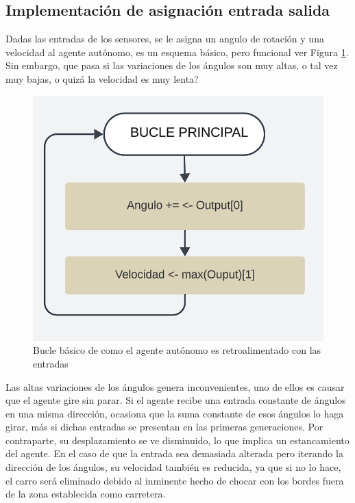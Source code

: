 \documentclass[conference]{IEEEtran}
\begin{document}
\subsection{Implementación de asignación entrada  salida}
Dadas las entradas de los sensores, se le asigna un angulo de rotación y una velocidad al agente autónomo, es un esquema básico, pero funcional ver Figura \ref{fig:Bucle_basico}. Sin embargo, que pasa si las variaciones de los ángulos son muy altas, o tal vez muy bajas, o quizá la velocidad es muy lenta?
\begin{figure}[H]
    \centering
    \includegraphics[scale=0.25]{images/bucle_inicial.png}
    \caption{Bucle básico de como el agente autónomo es retroalimentado con las entradas}
    \label{fig:Bucle_basico}
\end{figure} 
Las altas variaciones de los ángulos genera inconvenientes, uno de ellos es causar que el agente gire sin parar. Si el agente recibe una entrada constante de ángulos en una misma dirección, ocasiona que la suma constante de esos ángulos lo haga girar, más si dichas entradas se presentan en las primeras generaciones. Por contraparte, su desplazamiento se ve disminuido, lo que implica un estancamiento del agente. En el caso de que la entrada sea demasiada alterada pero iterando la dirección de los ángulos, su velocidad también es reducida, ya que si no lo hace, el carro será eliminado debido al inminente hecho de chocar con los bordes fuera de la zona establecida como carretera.
\end{document}
